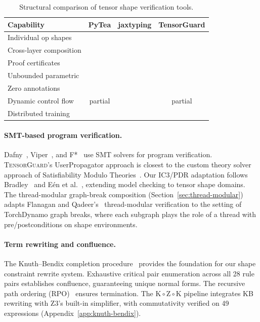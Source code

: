 \documentclass[11pt]{article}
\newcommand{\cmark}{\ding{51}}
\newcommand{\xmark}{\ding{55}}
\begin{document}
\begin{table}[t]
\centering
\caption{Structural comparison of tensor shape verification tools.}
\label{tab:pytea-comparison}
\small
\begin{tabular}{@{}lccc@{}}
\toprule
\textbf{Capability} & \textbf{PyTea} & \textbf{jaxtyping} & \textbf{TensorGuard} \\
\midrule
Individual op shapes    & \cmark & \cmark & \cmark \\
Cross-layer composition & \xmark & \xmark & \cmark \\
Proof certificates      & \xmark & \xmark & \cmark \\
Unbounded parametric    & \xmark & \xmark & \cmark \\
Zero annotations        & \cmark & \xmark & \cmark \\
Dynamic control flow    & partial & \cmark & partial \\
Distributed training    & \xmark & \xmark & \cmark \\
\bottomrule
\end{tabular}
\end{table}

\paragraph{SMT-based program verification.}
Dafny~\cite{leino10}, Viper~\cite{muller16}, and F*~\cite{fstar}
use SMT solvers for program verification.
\textsc{TensorGuard}'s UserPropagator approach is closest to
the custom theory solver approach of Satisfiability Modulo
Theories~\cite{barrett09}.  Our IC3/PDR adaptation follows
Bradley~\cite{bradley11} and E\'en et al.~\cite{een11},
extending model checking to tensor shape domains.
The thread-modular graph-break composition
(Section~\ref{sec:thread-modular}) adapts Flanagan and
Qadeer's~\cite{flanagan03} thread-modular verification to the
setting of TorchDynamo graph breaks, where each subgraph plays
the role of a thread with pre/postconditions on shape environments.

\paragraph{Term rewriting and confluence.}
The Knuth--Bendix completion procedure~\cite{knuthbendix70} provides
the foundation for our shape constraint rewrite system.  Exhaustive
critical pair enumeration across all 28 rule pairs establishes
confluence, guaranteeing unique normal forms.  The recursive path
ordering (RPO)~\cite{dershowitz82} ensures termination.  The
$\mathrm{K} \circ \mathrm{Z} \circ \mathrm{K}$ pipeline integrates
KB rewriting with Z3's built-in simplifier, with commutativity
verified on 49 expressions (Appendix~\ref{app:knuth-bendix}).
\end{document}
